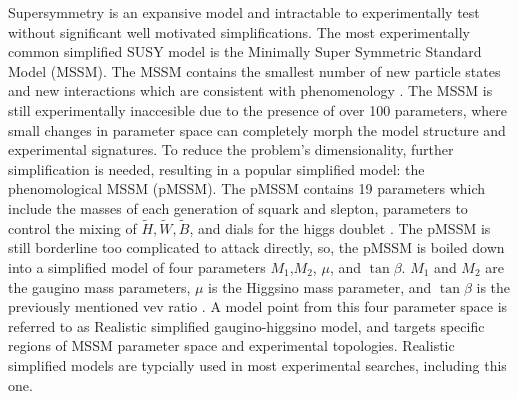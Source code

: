 Supersymmetry is an expansive model and intractable to experimentally test without significant well motivated simplifications. The most experimentally common simplified SUSY model is the Minimally Super Symmetric Standard Model (MSSM). The MSSM contains the smallest number of new particle states and new interactions which are consistent with phenomenology \cite{Baer:2007izw}. The MSSM is still experimentally inaccesible due to the presence of over 100 parameters, where small changes in parameter space can completely morph the model structure and experimental signatures. To reduce the problem's dimensionality, further simplification is needed, resulting in a popular simplified model: the phenomological MSSM (pMSSM). The pMSSM contains 19 parameters which include the masses of each generation of squark and slepton, parameters to control the mixing of $\tilde{H}, \tilde{W}, \tilde{B}$, and dials for the higgs doublet \cite{MSSMWorkingGroup:1998fiq}.  The pMSSM is still borderline too complicated to attack directly, so, the pMSSM is boiled down into a simplified model of four parameters $M_1$,$M_2$, $\mu$, and $\tan\beta$. $M_1$ and $M_2$ are the gaugino mass parameters, $\mu$ is the Higgsino mass parameter, and $\tan\beta$ is the previously mentioned vev ratio \cite{Fuks_2018}.  A model point from this four parameter space is referred to as Realistic simplified gaugino-higgsino model, and targets specific regions of MSSM parameter space and experimental topologies. Realistic simplified models are typcially used in most experimental searches, including this one.

